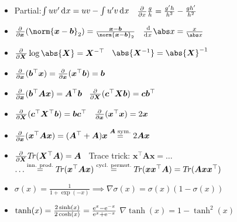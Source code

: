 \begin{itemize}
    \item Partial:\enskip $\int u v' \diff x = u v - \int u' v \diff x$
        \quad\textbullet\,
        $\pderiv{}{x} \frac{g}{h} = \frac{g'h}{h^2} - \frac{gh'}{h^2}$
    \item $\pderiv{}{\bm x} (\norm{\bm x - \bm b}_2) = \frac{\bm x-\bm b}{\norm{\bm x-\bm b}_2}$
        \quad\textbullet\,
        $\deriv{}{x} \abs x = \frac{x}{\abs x}$
    \item $\pderiv{}{\bm X} \log \abs{\bm X} = \bm X^{-\top}$
        \quad\textbullet\,
        $\abs{\bm X^{-1}} = \abs{\bm X}^{-1}$
        
    \item $\pderiv{}{\bm x} (\bm b^\top\bm  x) = \pderiv{}{\bm x} (\bm x^\top\bm  b) = \bm b$
    \item $\pderiv{}{\bm x} (\bm b^\top \bm{Ax}) = \bm A^\top \bm b$
        \quad\textbullet\,
        $\pderiv{}{\bm X} (\bm c^\top \bm{Xb}) = \bm{cb}^\top$
    \item $\pderiv{}{\bm X} (\bm c^\top \bm X^\top \bm b) = \bm{bc}^\top$
        \quad\textbullet\,
        $\pderiv{}{\bm x} (\bm x^\top \bm x) = 2\bm x$
    \item $\pderiv{}{\bm x} (\bm x^\top \bm{Ax}) = (\bm A^\top + \bm A)\bm x \overset{\bm A\textrm{ sym.}}{=} 2\bm{Ax}$
    \item $\pderiv{}{\bm X} T\!r(\bm X^\top \bm A) = \bm A$
        \quad\textbullet\,
        Trace trick:\enspace
            $\bm x^\top \bm{Ax} = \ldots$\\\hfill
            $\ldots \overset{\small\substack{\textrm{inn. prod.}}}{=} T\!r (\bm x^\top \bm{Ax}) \overset{\small\substack{\textrm{cycl. permut.}}}{=} T\!r(\bm{xx}^\top \bm A) = T\!r(\bm{Axx}^\top)$
    \item $\sigma(x) = \frac{1}{1 + \exp(-x)} \implies \nabla\sigma(x) = \sigma(x)(1-\sigma(x))$
    \item $\tanh(x) = \frac{2\sinh(x)}{2\cosh(x)} = \frac{\mathrm{e}^x - \mathrm{e}^{-x}}{\mathrm{e}^x+\mathrm{e}^{-x}}$
        \hfill\textbullet\hfill
        $\nabla\tanh(x) {=} 1 {-} \tanh^2(x)$
\end{itemize}

